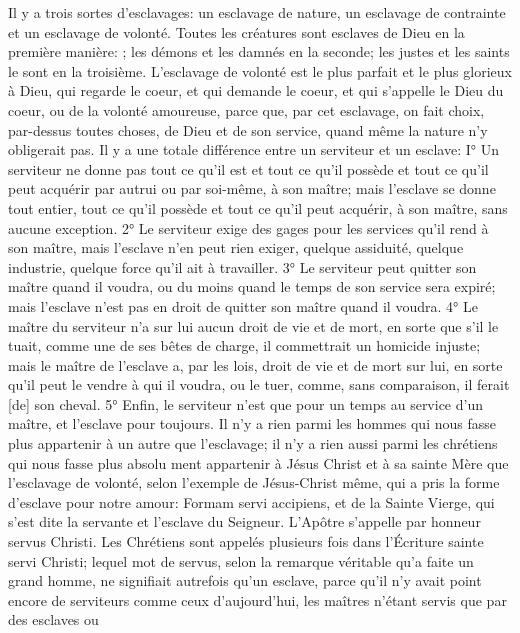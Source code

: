  Il y a trois sortes d'esclavages: un esclavage de nature, un esclavage de contrainte et un esclavage de
volonté. Toutes les créatures sont esclaves de Dieu en la première manière: ; les
démons et les damnés en la seconde; les justes et les saints le sont en la troisième. L'esclavage de volonté est le
plus parfait et le plus glorieux à Dieu, qui regarde le coeur, et qui demande le coeur, et qui s'appelle le Dieu du
coeur, ou de la volonté amoureuse, parce que, par cet esclavage, on fait choix, par-dessus toutes choses, de Dieu
et de son service, quand même la nature n'y obligerait pas.
 Il y a une totale différence entre un serviteur et un esclave:
I° Un serviteur ne donne pas tout ce qu'il est et tout ce qu'il possède et tout ce qu'il peut acquérir par autrui ou par
soi-même, à son maître; mais l'esclave se donne tout entier, tout ce qu'il possède et tout ce qu'il peut acquérir, à
son maître, sans aucune exception.
2° Le serviteur exige des gages pour les services qu'il rend à son maître, mais l'esclave n'en peut rien exiger,
quelque assiduité, quelque industrie, quelque force qu'il ait à travailler.
3° Le serviteur peut quitter son maître quand il voudra, ou du moins quand le temps de son service sera expiré;
mais l'esclave n'est pas en droit de quitter son maître quand il voudra.
4° Le maître du serviteur n'a sur lui aucun droit de vie et de mort, en sorte que s'il le tuait, comme une de ses bêtes
de charge, il commettrait un homicide injuste; mais le maître de l'esclave a, par les lois, droit de vie et de mort sur
lui, en sorte qu'il peut le vendre à qui il voudra, ou le tuer, comme, sans comparaison, il ferait [de] son cheval.
5° Enfin, le serviteur n'est que pour un temps au service d'un maître, et l'esclave pour toujours.
 Il n'y a rien parmi les hommes qui nous fasse plus appartenir à un autre que l'esclavage; il n'y a rien aussi
parmi les chrétiens qui nous fasse plus absolu ment appartenir à Jésus Christ et à sa sainte Mère que l'esclavage
de volonté, selon l'exemple de Jésus-Christ même, qui a pris la forme d'esclave pour notre amour: Formam servi
accipiens, et de la Sainte Vierge, qui s'est dite la servante et l'esclave du Seigneur. L'Apôtre s'appelle par honneur
servus Christi. Les Chrétiens sont appelés plusieurs fois dans l'Écriture sainte servi Christi; lequel mot de servus,
selon la remarque véritable qu'a faite un grand homme, ne signifiait autrefois qu'un esclave, parce qu'il n'y avait
point encore de serviteurs comme ceux d'aujourd'hui, les maîtres n'étant servis que par des esclaves ou
